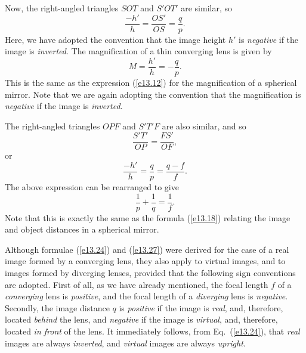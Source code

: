 Now, the right-angled triangles $SOT$ and $S'OT'$ are similar, so
\begin{equation}
\frac{-h'}{h} = \frac{OS'}{OS} = \frac{q}{p}.
\end{equation}
Here, we have adopted the convention that the image height $h'$ is
{\em negative}\/ if the image is {\em inverted}. The magnification of a thin 
converging lens is given by
\begin{equation}\label{e13.24}
M = \frac{h'}{h} = -\frac{q}{p}.
\end{equation}
This is the same as the expression (\ref{e13.12}) for the magnification 
of a spherical mirror. Note that we are again adopting the convention
that the magnification is {\em negative} if the image is {\em inverted}. 

The right-angled triangles $OPF$ and $S'T'F$ are also similar, and
so
\begin{equation}
\frac{S'T'}{OP} = \frac{FS'}{OF},
\end{equation}
or
\begin{equation}
\frac{-h'}{h} = \frac{q}{p} = \frac{q-f}{f}.
\end{equation}
The above expression can be rearranged to give
\begin{equation}\label{e13.27}
\frac{1}{p} + \frac{1}{q} = \frac{1}{f}.
\end{equation}
Note that this is exactly the same as the formula (\ref{e13.18}) relating  the
image and object distances in a spherical mirror. 

Although formulae (\ref{e13.24}) and (\ref{e13.27}) were derived for the case of a real
image formed by a converging lens, they also apply to virtual images, and
to images formed by diverging lenses, provided that the following sign conventions are adopted. First of all, as we have already mentioned, the focal
length $f$ of a {\em converging}\/ lens is {\em positive}, and the focal length of
a {\em diverging}\/ lens is {\em negative}. Secondly, the image distance $q$ is
{\em positive}\/ if the image is {\em real}, and, therefore, located
{\em behind} the lens, and {\em negative}\/ if the image is {\em virtual},
and, therefore, located {\em in front}\/ of the lens. It immediately follows,
from Eq.~(\ref{e13.24}), that {\em real}\/ images are always {\em inverted}, and
{\em virtual}\/ images are always {\em upright}. 

